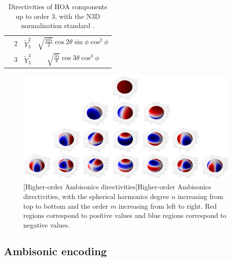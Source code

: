 \begin{table}[h!]
\begin{tabular}{|cccc|}
                  & \rule{0pt}{14pt} $2$           &  $\tilde{Y}_3^{2}$          & $\sqrt{\frac{105}{2}} \cos 2 \theta \sin \phi \cos^2 \phi$           \\
                  & \rule{0pt}{14pt} $3$           &  $\tilde{Y}_3^{3}$          & $\sqrt{\frac{35}{8}} \cos 3 \theta \cos^3 \phi$           \\ \hline
\end{tabular}
\caption[Directivities of HOA components]{Directivities of HOA components up to order 3, with the N3D normalization standard \cite{daniel_representation_2001}.}
\label{tab:hoaComponents}
\end{table}

\begin{figure}[t]
    \begin{center}
    \includegraphics[width=1.\linewidth]{Images/chap2/hoa.png}
    [Higher-order Ambisonics directivities]{Higher-order Ambisonics directivities, with the spherical harmonics degree $n$ increasing from top to bottom and the order $m$ increasing from left to right. Red regions correspond to positive values and blue regions correspond to negative values.}
    \label{fig:hoa}
    \end{center}
\end{figure}


\subsection{Ambisonic encoding}
\label{subAmbEncoding}

